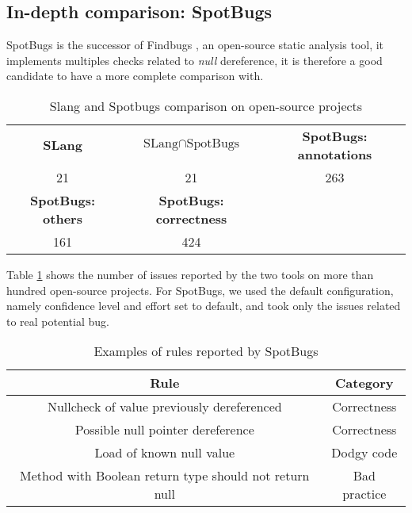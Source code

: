 \subsection{In-depth comparison: SpotBugs}
\label{subsec:indpeth_comparison_spotbugs}

SpotBugs \cite{Spotbugs:2019:Online} is the successor of Findbugs \cite{FindBugs:2019:Online}, an open-source static analysis tool, it implements multiples checks related to \emph{null} dereference, it is therefore a good candidate to have a more complete comparison with.

\begin{table}[h]
	\centering
	\caption{Slang and Spotbugs comparison on open-source projects}
	\label{table:slang_vs_spotbugs}
	\begin{tabular}{|c|c|c|}
		\hline
		\bf SLang & \bf $\text{SLang} \cap \text{SpotBugs}$ & \bf SpotBugs: annotations \\
		21 & 21 & 263 \\ \hline
		\bf SpotBugs: others & \bf SpotBugs: correctness & \\ 
		161 & 424 &  \\ \hline
	\end{tabular}
\end{table}

Table \ref{table:slang_vs_spotbugs} shows the number of issues reported by the two tools on more than hundred open-source projects. 
For SpotBugs, we used the default configuration, namely confidence level and effort set to default, and took only the issues related to real potential bug.

\begin{table}[h]
	\centering
	\caption{Examples of rules reported by SpotBugs}
	\label{table:spotbugs-rules}
	\begin{tabular}{|c|c|}
		\hline
		\bf Rule & \bf Category\\ \hline
		Nullcheck of value previously dereferenced & Correctness  \\
		Possible null pointer dereference & Correctness  \\
		Load of known null value & Dodgy code \\
		Method with Boolean return type should not return null & Bad practice \\ \hline
	\end{tabular}
\end{table}


